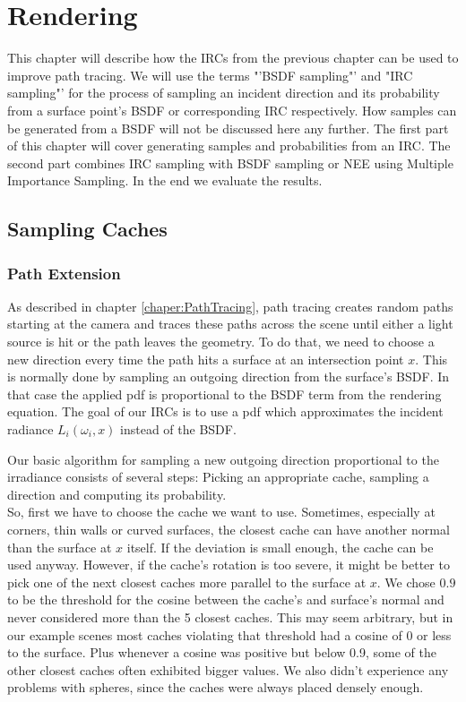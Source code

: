 \chapter{Rendering}
\label{chapter:rendering}
This chapter will describe how the IRCs from the previous chapter can be used to improve path tracing.
We will use the terms "'BSDF sampling"' and "IRC sampling"' for the process of sampling an incident direction and its probability from a surface point's BSDF or corresponding IRC respectively. How samples can be generated from a BSDF will not be discussed here any further.\newline
The first part of this chapter will cover generating samples and probabilities from an IRC. The second part combines IRC sampling with BSDF sampling or NEE using Multiple Importance Sampling. In the end we evaluate the results.


\section{Sampling Caches}
\subsection{Path Extension}
\label{path extension}
As described in chapter \ref{chaper:PathTracing}, path tracing creates random paths starting at the camera and traces these paths across the scene until either a light source is hit or the path leaves the geometry. To do that, we need to choose a new direction every time the path hits a surface at an intersection point $x$. This is normally done by sampling an outgoing direction from the surface's BSDF. In that case the applied pdf is proportional to the BSDF term from the rendering equation. The goal of our IRCs is to use a pdf which approximates the incident radiance $L_i(\omega_i,x)$ instead of the BSDF.

Our basic algorithm for sampling a new outgoing direction proportional to the irradiance consists of several steps: Picking an appropriate cache, sampling a direction and computing its probability.\\
So, first we have to choose the cache we want to use. Sometimes, especially at corners, thin walls or curved surfaces, the closest cache can have another normal than the surface at $x$ itself. If the deviation is small enough, the cache can be used anyway. However, if the cache's rotation is too severe, it might be better to pick one of the next closest caches more parallel to the surface at $x$. We chose $0.9$ to be the threshold for the cosine between the cache's and surface's normal and never considered more than the 5 closest caches.\newline
This may seem arbitrary, but in our example scenes most caches violating that threshold had a cosine of $0$ or less to the surface. Plus whenever a cosine was positive but below 0.9, some of the other closest caches often exhibited bigger values. We also didn't experience any problems with spheres, since the caches were always placed densely enough.

